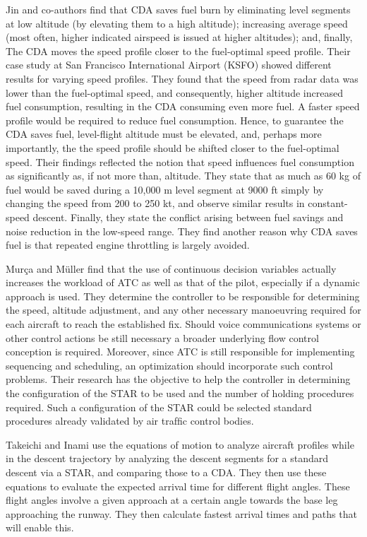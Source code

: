 \documentclass{aer1315-pretty}
\begin{document}
Jin and co-authors \cite{Jin:2013} find that CDA saves fuel burn by eliminating level segments at low altitude (by elevating them to a high altitude); increasing average speed (most often, higher indicated airspeed is issued at higher altitudes); and, finally, The CDA moves the speed profile closer to the fuel-optimal speed profile. Their case study at San Francisco International Airport (KSFO) showed different results for varying speed profiles. 
They found that the speed from radar data was lower than the fuel-optimal speed, and consequently, higher altitude increased fuel consumption, resulting in the CDA consuming even more fuel. A faster speed profile would be required to reduce fuel consumption. Hence, to guarantee the CDA saves fuel, level-flight altitude must be elevated, and, perhaps more importantly, the the speed profile should be shifted closer to the fuel-optimal speed. Their findings reflected the notion that speed influences fuel consumption as significantly as, if not more than, altitude. They state that as much as 60 kg of fuel would be saved during a 10,000 m level segment at 9000 ft simply by changing the speed from 200 to 250 kt, and observe similar results in constant-speed descent. Finally, they state the conflict arising between fuel savings and noise reduction in the low-speed range. They find another reason why CDA saves fuel is that repeated engine throttling is largely avoided. \par

Mur\c{c}a and M{\"u}ller \cite{Murca:2015} find that the use of continuous decision variables actually increases the workload of ATC as well as that of the pilot, especially if a dynamic approach is used. They determine the controller to be responsible for determining the speed, altitude adjustment, and any other necessary manoeuvring required for each aircraft to reach the established fix. Should voice communications systems or other control actions be still necessary a broader underlying flow control conception is required. Moreover, since ATC is still responsible for implementing sequencing and scheduling, an optimization should incorporate such control problems. Their research has the objective to help the controller in determining the configuration of the STAR to be used and the number of holding procedures required. Such a conﬁguration of the STAR could be selected standard procedures already validated by air trafﬁc control bodies. \par

Takeichi and Inami \cite{Takeichi:2010} use the equations of motion to analyze aircraft profiles while in the descent trajectory by analyzing the descent segments for a standard descent via a STAR, and comparing those to a CDA. They then use these equations to evaluate the expected arrival time for different flight angles. These flight angles involve a given approach at a certain angle towards the base leg approaching the runway. They then calculate fastest arrival times and paths that will enable this. \par
\end{document}

